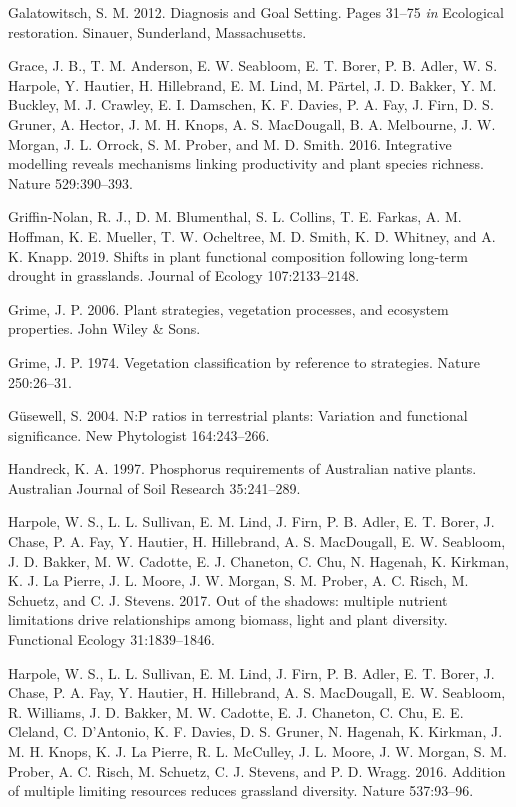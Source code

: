 \documentclass[twoside,12pt,final]{ucthesis-CA2012}
\begin{document}
\begin{ucmainmatter}
\leavevmode\hypertarget{ref-Galatowitsch2012}{}%
Galatowitsch, S. M. 2012. Diagnosis and Goal Setting. Pages 31--75 \emph{in} Ecological restoration. Sinauer, Sunderland, Massachusetts.

\leavevmode\hypertarget{ref-Grace2016a}{}%
Grace, J. B., T. M. Anderson, E. W. Seabloom, E. T. Borer, P. B. Adler, W. S. Harpole, Y. Hautier, H. Hillebrand, E. M. Lind, M. Pärtel, J. D. Bakker, Y. M. Buckley, M. J. Crawley, E. I. Damschen, K. F. Davies, P. A. Fay, J. Firn, D. S. Gruner, A. Hector, J. M. H. Knops, A. S. MacDougall, B. A. Melbourne, J. W. Morgan, J. L. Orrock, S. M. Prober, and M. D. Smith. 2016. Integrative modelling reveals mechanisms linking productivity and plant species richness. Nature 529:390--393.

\leavevmode\hypertarget{ref-Griffin-Nolan2019}{}%
Griffin-Nolan, R. J., D. M. Blumenthal, S. L. Collins, T. E. Farkas, A. M. Hoffman, K. E. Mueller, T. W. Ocheltree, M. D. Smith, K. D. Whitney, and A. K. Knapp. 2019. Shifts in plant functional composition following long-term drought in grasslands. Journal of Ecology 107:2133--2148.

\leavevmode\hypertarget{ref-Grime2006}{}%
Grime, J. P. 2006. Plant strategies, vegetation processes, and ecosystem properties. John Wiley \& Sons.

\leavevmode\hypertarget{ref-Grime1974}{}%
Grime, J. P. 1974. Vegetation classification by reference to strategies. Nature 250:26--31.

\leavevmode\hypertarget{ref-Gusewell2004}{}%
Güsewell, S. 2004. N:P ratios in terrestrial plants: Variation and functional significance. New Phytologist 164:243--266.

\leavevmode\hypertarget{ref-Handreck1997}{}%
Handreck, K. A. 1997. Phosphorus requirements of Australian native plants. Australian Journal of Soil Research 35:241--289.

\leavevmode\hypertarget{ref-Harpole2017}{}%
Harpole, W. S., L. L. Sullivan, E. M. Lind, J. Firn, P. B. Adler, E. T. Borer, J. Chase, P. A. Fay, Y. Hautier, H. Hillebrand, A. S. MacDougall, E. W. Seabloom, J. D. Bakker, M. W. Cadotte, E. J. Chaneton, C. Chu, N. Hagenah, K. Kirkman, K. J. La Pierre, J. L. Moore, J. W. Morgan, S. M. Prober, A. C. Risch, M. Schuetz, and C. J. Stevens. 2017. Out of the shadows: multiple nutrient limitations drive relationships among biomass, light and plant diversity. Functional Ecology 31:1839--1846.

\leavevmode\hypertarget{ref-Harpole2016}{}%
Harpole, W. S., L. L. Sullivan, E. M. Lind, J. Firn, P. B. Adler, E. T. Borer, J. Chase, P. A. Fay, Y. Hautier, H. Hillebrand, A. S. MacDougall, E. W. Seabloom, R. Williams, J. D. Bakker, M. W. Cadotte, E. J. Chaneton, C. Chu, E. E. Cleland, C. D'Antonio, K. F. Davies, D. S. Gruner, N. Hagenah, K. Kirkman, J. M. H. Knops, K. J. La Pierre, R. L. McCulley, J. L. Moore, J. W. Morgan, S. M. Prober, A. C. Risch, M. Schuetz, C. J. Stevens, and P. D. Wragg. 2016. Addition of multiple limiting resources reduces grassland diversity. Nature 537:93--96.


\end{ucmainmatter}
\end{document}
